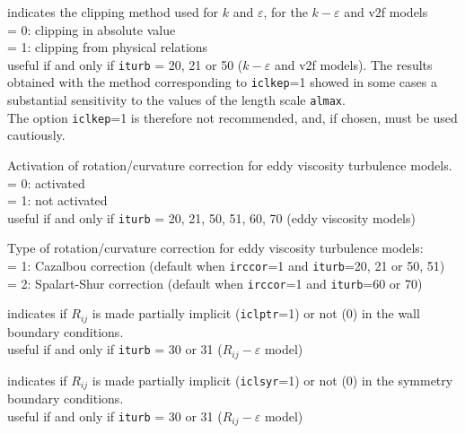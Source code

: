 {indicates the clipping method used for $k$ and
$\varepsilon$, for the $k-\varepsilon$ and v2f models\\
\hspace*{1.3cm}= 0: clipping in absolute value\\
\hspace*{1.3cm}= 1: clipping from physical relations\\
useful if and only if {\tt iturb} = 20, 21 or 50 ($k-\varepsilon$ and
v2f models). The results obtained with the method corresponding to
{\tt iclkep}=1 showed in some cases a substantial sensitivity to the
values of the length scale {\tt almax}.\\
The option {\tt iclkep}=1 is therefore not recommended, and,
if chosen, must be used cautiously.}

{Activation of rotation/curvature correction for eddy viscosity turbulence models.\\
\hspace*{1.3cm}= 0: activated\\
\hspace*{1.3cm}= 1: not activated\\
useful if and only if {\tt iturb} = 20, 21, 50, 51, 60, 70 (eddy viscosity models)
}

{Type of rotation/curvature correction for eddy viscosity turbulence models:\\
\hspace*{1.3cm}= 1: Cazalbou correction (default when {\tt irccor}=1 and {\tt iturb}=20, 21 or 50, 51)\\
\hspace*{1.3cm}= 2: Spalart-Shur correction (default when {\tt irccor}=1 and {\tt iturb}=60 or 70)
}


{indicates if $R_{ij}$ is made partially implicit
({\tt iclptr}=1) or not (0) in the wall boundary conditions.\\
useful if and only if {\tt iturb} = 30 or 31 ($R_{ij}-\varepsilon$ model)}

{indicates if $R_{ij}$ is made partially implicit
({\tt iclsyr}=1) or not (0) in the symmetry boundary conditions.\\
useful if and only if {\tt iturb} = 30 or 31 ($R_{ij}-\varepsilon$ model)}

